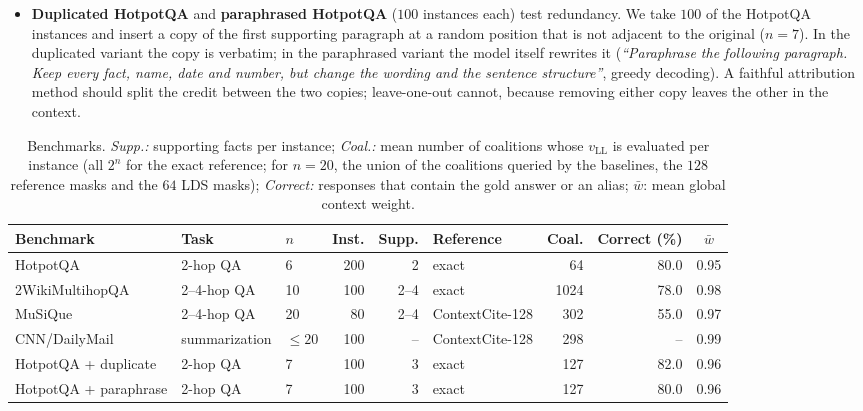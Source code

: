 \begin{itemize}
    \item \textbf{Duplicated HotpotQA} and \textbf{paraphrased HotpotQA} ($100$ instances each) test redundancy. We take $100$ of the HotpotQA instances and insert a copy of the first supporting paragraph at a random position that is not adjacent to the original ($n = 7$). In the duplicated variant the copy is verbatim; in the paraphrased variant the model itself rewrites it (\emph{``Paraphrase the following paragraph. Keep every fact, name, date and number, but change the wording and the sentence structure''}, greedy decoding). A faithful attribution method should split the credit between the two copies; leave-one-out cannot, because removing either copy leaves the other in the context.
\end{itemize}

\begin{table}[t]
\centering
\small
\setlength{\tabcolsep}{3pt}
\begin{tabular}{lllrrlrrc}
\toprule
Benchmark & Task & $n$ & Inst. & Supp. & Reference & Coal. & Correct (\%) & $\bar w$ \\
\midrule
HotpotQA & 2-hop QA & 6 & 200 & 2 & exact & 64 & 80.0 & 0.95 \\
2WikiMultihopQA & 2--4-hop QA & 10 & 100 & 2--4 & exact & 1024 & 78.0 & 0.98 \\
MuSiQue & 2--4-hop QA & 20 & 80 & 2--4 & ContextCite-128 & 302 & 55.0 & 0.97 \\
CNN/DailyMail & summarization & $\le 20$ & 100 & -- & ContextCite-128 & 298 & -- & 0.99 \\
HotpotQA + duplicate & 2-hop QA & 7 & 100 & 3 & exact & 127 & 82.0 & 0.96 \\
HotpotQA + paraphrase & 2-hop QA & 7 & 100 & 3 & exact & 127 & 80.0 & 0.96 \\
\bottomrule
\end{tabular}
\caption{Benchmarks. \emph{Supp.:} supporting facts per instance; \emph{Coal.:} mean number of coalitions whose $v_{\text{LL}}$ is evaluated per instance (all $2^n$ for the exact reference; for $n = 20$, the union of the coalitions queried by the baselines, the $128$ reference masks and the $64$ LDS masks); \emph{Correct:} responses that contain the gold answer or an alias; $\bar w$: mean global context weight.}
\label{tab:exp_benchmarks}
\end{table}

